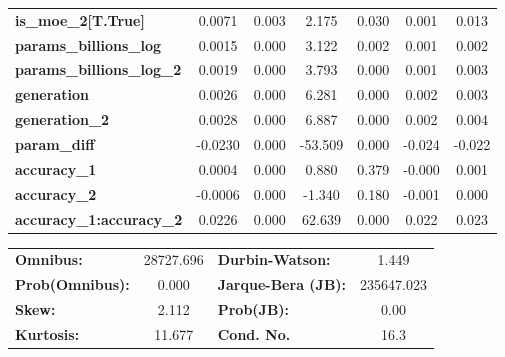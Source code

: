\begin{center}
\begin{tabular}{lcccccc}
\textbf{is\_moe\_2[T.True]}         &       0.0071  &        0.003     &     2.175  &         0.030        &        0.001    &        0.013     \\
\textbf{params\_billions\_log}      &       0.0015  &        0.000     &     3.122  &         0.002        &        0.001    &        0.002     \\
\textbf{params\_billions\_log\_2}   &       0.0019  &        0.000     &     3.793  &         0.000        &        0.001    &        0.003     \\
\textbf{generation}                 &       0.0026  &        0.000     &     6.281  &         0.000        &        0.002    &        0.003     \\
\textbf{generation\_2}              &       0.0028  &        0.000     &     6.887  &         0.000        &        0.002    &        0.004     \\
\textbf{param\_diff}                &      -0.0230  &        0.000     &   -53.509  &         0.000        &       -0.024    &       -0.022     \\
\textbf{accuracy\_1}                &       0.0004  &        0.000     &     0.880  &         0.379        &       -0.000    &        0.001     \\
\textbf{accuracy\_2}                &      -0.0006  &        0.000     &    -1.340  &         0.180        &       -0.001    &        0.000     \\
\textbf{accuracy\_1:accuracy\_2}    &       0.0226  &        0.000     &    62.639  &         0.000        &        0.022    &        0.023     \\
\bottomrule
\end{tabular}
\begin{tabular}{lclc}
\textbf{Omnibus:}       & 28727.696 & \textbf{  Durbin-Watson:     } &     1.449   \\
\textbf{Prob(Omnibus):} &    0.000  & \textbf{  Jarque-Bera (JB):  } & 235647.023  \\
\textbf{Skew:}          &    2.112  & \textbf{  Prob(JB):          } &      0.00   \\
\textbf{Kurtosis:}      &   11.677  & \textbf{  Cond. No.          } &      16.3   \\
\bottomrule
\end{tabular}
\end{center}